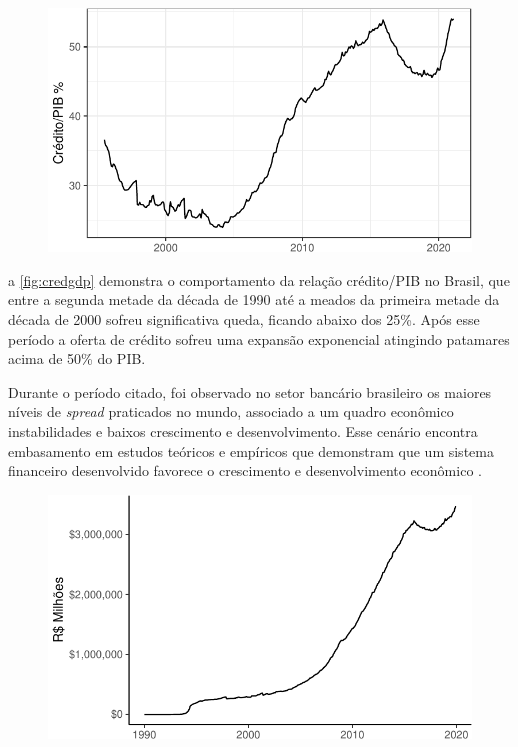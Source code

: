 \documentclass[12pt,openright,oneside,a4paper,chapter=TITLE,section=TITLE,subsection=TITLE,english,french,spanish,portugues,sumario=tradicional]{abntex2}
\begin{document}
\begin{figure}

\begin{center}\includegraphics{12-exportedfigures/credit gdp-1} \end{center}
\label{fig:credgdp}
\end{figure}

a \autoref{fig:credgdp} demonstra o comportamento da relação crédito/PIB no
Brasil, que entre a segunda metade da década de 1990 até a meados da primeira
metade da década de 2000 sofreu significativa queda, ficando abaixo dos 25\%.
Após esse período a oferta de crédito sofreu uma expansão exponencial atingindo
patamares acima de 50\% do PIB.

Durante o período citado, foi observado no setor bancário brasileiro os maiores
níveis de \emph{spread} praticados no mundo, associado a um quadro econômico
instabilidades e baixos crescimento e desenvolvimento. Esse cenário encontra
embasamento em estudos teóricos e empíricos que demonstram que um sistema
financeiro desenvolvido favorece o crescimento e desenvolvimento econômico
\cite{levine:1997, matos:2003}.

\begin{figure}

\begin{center}\includegraphics{12-exportedfigures/balance credit-1} \end{center}
\label{fig:saldocredito}
\end{figure}
\end{document}
